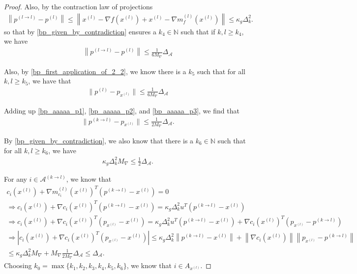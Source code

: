 \documentclass{article}
\theoremstyle{case}
\newcommand{\dk}{\Delta_k}
\newcommand{\maxgrad}{{M_{\nabla}}}
\newcommand{\minactivegraddelta}{{\Delta_{\mathcal A}}}
\newcommand{\naturals}{\mathbb N}
\begin{document}
\begin{proof}
Also, by the contraction law of projections
\begin{align*}
\left\|p^{(l\to l)} - p^{(l)}\right\| 
\le \left\|x^{(l)} - \nabla f\left(x^{(l)}\right) + x^{(l)} - \nabla m_{f}^{(l)}\left(x^{(l)}\right)\right\|
\le \kappa_g \dk^2.
\end{align*}
so that by \cref{bp_given_by_contradiction} ensures a $k_4\in\naturals$ such that if $k, l \ge k_4$, we have
\begin{align}
\left\|p^{(l\to l)} - p^{(l)}\right\| \le \frac 1 {6\maxgrad} \minactivegraddelta \label{bp_aaaaa_p2}
\end{align}

Also, by \cref{bp_first_application_of_2_2}, we know there is a $k_5$ such that for all $k, l \ge k_5$, we have that
\begin{align}
\| p^{(l)} - p_{x^{(l)}} \| \le \frac 1 {6\maxgrad} \minactivegraddelta \label{bp_aaaaa_p3}
\end{align}

Adding up \cref{bp_aaaaa_p1}, \cref{bp_aaaaa_p2}, and \cref{bp_aaaaa_p3}, we find that
\begin{align*}
\| p^{(k\to l)} - p_{x^{(l)}} \| \le \frac 1 {2\maxgrad}\minactivegraddelta.
\end{align*}

By \cref{bp_given_by_contradiction}, we also know that there is a $k_6 \in \naturals$ such that for all $k, l \ge k_6$, we have
\begin{align*}
\kappa_g \dk^2 \maxgrad \le \frac 1 2 \minactivegraddelta.
\end{align*}



For any $i \in \mathcal A^{(k\to l)}$, we know that
\begin{align*}
c_i\left(x^{(l)}\right) + \nabla m_{c_i}^{(l)}\left(x^{(l)}\right)^T\left(p^{(k\to l)} - x^{(l)}\right) = 0 \\
\Longrightarrow c_i\left(x^{(l)}\right) + \nabla c_i\left(x^{(l)}\right)^T\left(p^{(k\to l)} - x^{(l)}\right) = \kappa_g \dk^2 u^T\left(p^{(k\to l)} - x^{(l)}\right) \\
\Longrightarrow c_i\left(x^{(l)}\right) + \nabla c_i\left(x^{(l)}\right)^T\left(p_{x^{(l)}} - x^{(l)}\right) 
= \kappa_g \dk^2 u^T\left(p^{(k\to l)} - x^{(l)}\right) + \nabla c_i\left(x^{(l)}\right)^T\left(p_{x^{(l)}} - p^{(k\to l)}\right)\\
\Longrightarrow \left|c_i\left(x^{(l)}\right) + \nabla c_i\left(x^{(l)}\right)^T\left(p_{x^{(l)}} - x^{(l)}\right) \right|
\le \kappa_g \dk^2 \left\|p^{(k\to l)} - x^{(l)}\right\| + \left\|\nabla c_i\left(x^{(l)}\right)\right\|\left\|p_{x^{(l)}} - p^{(k\to l)}\right\|\\
\le \kappa_g \dk^2 \maxgrad + \maxgrad \frac 1 {2\maxgrad}\minactivegraddelta \le \minactivegraddelta.
\end{align*}
Choosing $k_0 = \max\{k_1, k_2, k_3, k_4, k_5, k_6\}$, we know that $i \in A_{x^{(l)}}$.
\end{proof}
\end{document}
